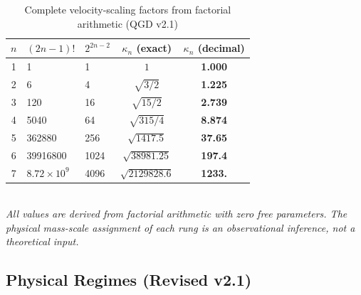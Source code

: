 

\begin{table}[h]
	\centering
	\caption{Complete velocity-scaling factors from factorial arithmetic (QGD v2.1)}
	\label{tab:kappa_v21}
	\begin{tabular}{@{}cllcc@{}}
		\toprule
		$n$ & $(2n-1)!$ & $2^{2n-2}$ & $\kappa_n$ (exact) & $\kappa_n$ (decimal) \\
		\midrule
		1 & 1          & 1    & $1$                       & \textbf{1.000} \\
		2 & 6          & 4    & $\sqrt{3/2}$              & \textbf{1.225} \\
		3 & 120        & 16   & $\sqrt{15/2}$             & \textbf{2.739} \\
		4 & 5040       & 64   & $\sqrt{315/4}$            & \textbf{8.874} \\
		5 & 362880     & 256  & $\sqrt{1417.5}$           & \textbf{37.65} \\
		6 & 39916800   & 1024 & $\sqrt{38981.25}$         & \textbf{197.4} \\
		7 & $8.72\times10^9$ & 4096 & $\sqrt{2129828.6}$ & \textbf{1233.} \\
		\bottomrule
	\end{tabular}
	\smallskip\\
	\emph{All values are derived from factorial arithmetic with zero free parameters.
	The physical mass-scale assignment of each rung is an observational inference,
	not a theoretical input.}
\end{table}


\subsection{Physical Regimes (Revised v2.1)}


